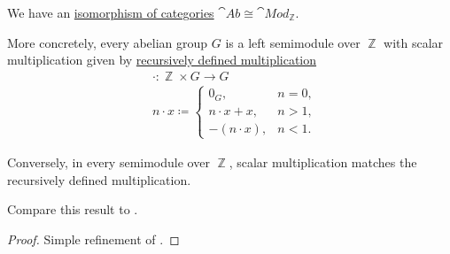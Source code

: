 \begin{proposition}\label{thm:abelian_group_is_module}
  We have an \hyperref[rem:category_similarity/isomorphism]{isomorphism of categories} \( \hyperref[def:abelian_group]{\cat{Ab}} \cong \hyperref[def:module]{\cat{Mod}_\BbbZ} \).

  More concretely, every abelian group \( G \) is a left semimodule over \( \BbbZ \) with scalar multiplication given by \hyperref[rem:additive_magma/multiplication]{recursively defined multiplication}
  \begin{equation}\label{eq:thm:abelian_group_is_module/operation}
    \begin{aligned}
      &\cdot: \BbbZ \times G \to G \\
      &n \cdot x \coloneqq \begin{cases}
        0_G,           &n = 0, \\
        n \cdot x + x, &n > 1, \\
        -(n \cdot x),  &n < 1.
      \end{cases}
    \end{aligned}
  \end{equation}

  Conversely, in every semimodule over \( \BbbZ \), scalar multiplication matches the recursively defined multiplication.

  Compare this result to .
\end{proposition}
\begin{proof}
  Simple refinement of .
\end{proof}

